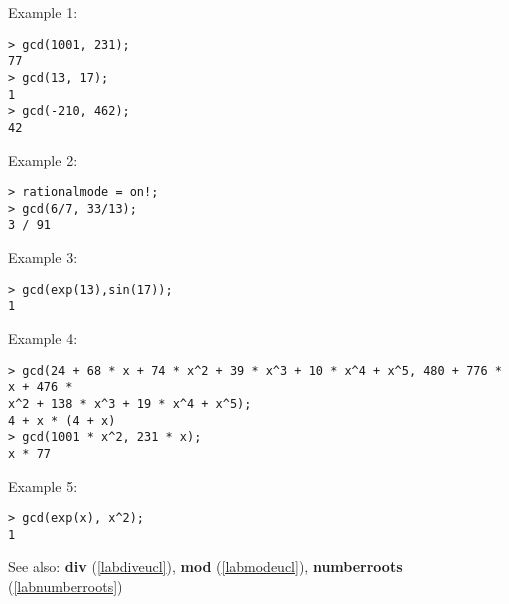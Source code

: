 \noindent Example 1: 
\begin{center}\begin{minipage}{15cm}\begin{Verbatim}[frame=single]
> gcd(1001, 231);
77
> gcd(13, 17);
1
> gcd(-210, 462);
42
\end{Verbatim}
\end{minipage}\end{center}
\noindent Example 2: 
\begin{center}\begin{minipage}{15cm}\begin{Verbatim}[frame=single]
> rationalmode = on!;
> gcd(6/7, 33/13);
3 / 91
\end{Verbatim}
\end{minipage}\end{center}
\noindent Example 3: 
\begin{center}\begin{minipage}{15cm}\begin{Verbatim}[frame=single]
> gcd(exp(13),sin(17));
1
\end{Verbatim}
\end{minipage}\end{center}
\noindent Example 4: 
\begin{center}\begin{minipage}{15cm}\begin{Verbatim}[frame=single]
> gcd(24 + 68 * x + 74 * x^2 + 39 * x^3 + 10 * x^4 + x^5, 480 + 776 * x + 476 * 
x^2 + 138 * x^3 + 19 * x^4 + x^5);
4 + x * (4 + x)
> gcd(1001 * x^2, 231 * x);
x * 77
\end{Verbatim}
\end{minipage}\end{center}
\noindent Example 5: 
\begin{center}\begin{minipage}{15cm}\begin{Verbatim}[frame=single]
> gcd(exp(x), x^2);
1
\end{Verbatim}
\end{minipage}\end{center}
See also: \textbf{div} (\ref{labdiveucl}), \textbf{mod} (\ref{labmodeucl}), \textbf{numberroots} (\ref{labnumberroots})
